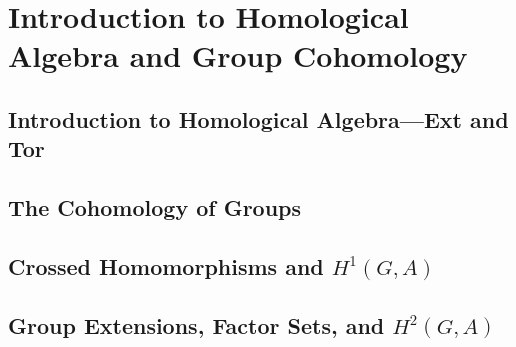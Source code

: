 \chapter{Introduction to Homological Algebra and Group Cohomology}

\section{Introduction to Homological Algebra—Ext and Tor}

\section{The Cohomology of Groups}

\section{Crossed Homomorphisms and $H^1(G, A)$}

\section{Group Extensions, Factor Sets, and $H^2(G, A)$}
